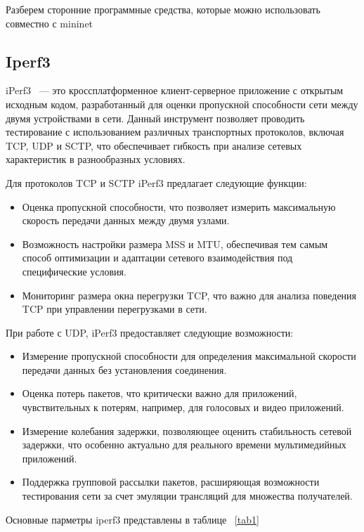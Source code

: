 Разберем сторонние программные средства, которые можно использовать совместно с mininet

\subsection{Iperf3}

iPerf3~\cite{iperf3} --- это кроссплатформенное клиент-серверное приложение с открытым исходным кодом, 
разработанный для оценки пропускной способности сети между двумя устройствами в сети. 
Данный инструмент позволяет проводить тестирование с использованием различных транспортных протоколов, включая TCP, UDP и SCTP, 
что обеспечивает гибкость при анализе сетевых характеристик в разнообразных условиях.

Для протоколов TCP и SCTP iPerf3 предлагает следующие функции:
\begin{itemize}
\item Оценка пропускной способности, что позволяет измерить максимальную скорость передачи данных между двумя узлами.
\item Возможность настройки размера MSS и MTU, обеспечивая 
    тем самым способ оптимизации и адаптации сетевого взаимодействия под специфические условия.
\item Мониторинг размера окна перегрузки TCP, что важно для анализа поведения TCP при управлении перегрузками в сети.
\end{itemize}

При работе с UDP, iPerf3 предоставляет следующие возможности:
\begin{itemize}
\item Измерение пропускной способности для определения максимальной скорости передачи данных без установления соединения.
\item Оценка потерь пакетов, что критически важно для приложений, чувствительных к потерям, например, для голосовых и видео приложений.
\item Измерение колебания задержки, позволяющее оценить стабильность сетевой задержки, 
    что особенно актуально для реального времени мультимедийных приложений.
\item Поддержка групповой рассылки пакетов, расширяющая возможности 
    тестирования сети за счет эмуляции трансляций для множества получателей.
\end{itemize}

Основные парметры iperf3 представлены в таблице ~\ref{tab1}

